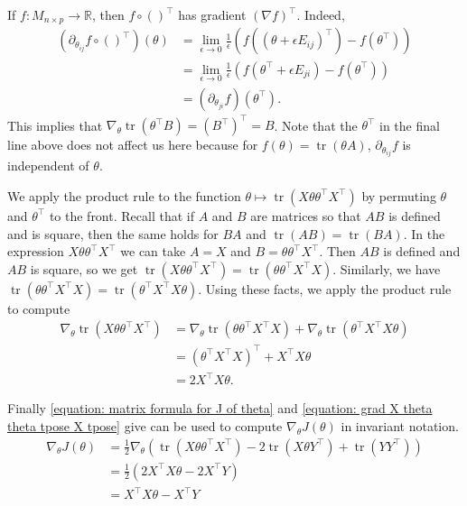 \documentclass[paper=letter]{scrartcl}
\theoremstyle{definition}
\DeclareMathOperator{\trace}{tr}
\newcommand{\grad}{\nabla}
\newcommand{\tpose}{^\top}
\newcommand{\reals}{\mathbb R}
\begin{document}
If $f \colon M_{n \times p} \to \reals$, then $f\circ ()\tpose$ has gradient 
$(\grad f)\tpose$.  Indeed,
\begin{align*}
	(\partial_{\theta_{ij}} f\circ ()\tpose)(\theta)
	&= \lim_{\epsilon \to 0} \frac{1}{\epsilon} (f((\theta + \epsilon 
	E_{ij})\tpose) - f(\theta\tpose))\\
	&= \lim_{\epsilon \to 0} \frac{1}{\epsilon} (f(\theta\tpose + \epsilon 
	E_{ji}) - f(\theta\tpose))\\
	&= (\partial_{\theta_{ji}} f)(\theta\tpose).
\end{align*}
This implies that $\grad_{\theta} \trace(\theta\tpose B) = (B\tpose) \tpose = 
B$. Note that the $\theta\tpose$ in the final line above does not affect us 
here because for $f(\theta) = \trace(\theta A)$, $\partial_{\theta_{ij}} f$ is 
independent of $\theta$.  

We apply the product rule to the function $\theta \mapsto \trace(X\theta 
\theta\tpose X\tpose)$ by permuting $\theta$ and $\theta\tpose$ to the front.  
Recall that if $A$ and $B$ are matrices so that $AB$ is defined and is square, 
then the same holds for $BA$ and $\trace(AB) = \trace (BA)$.  In the expression 
$X\theta \theta\tpose X \tpose$ we can take $A = X$ and $B = \theta 
\theta\tpose X\tpose$.  Then $AB$ is defined and $AB$ is square, so we get 
$\trace(X \theta \theta\tpose X\tpose) = \trace(\theta \theta \tpose X\tpose 
X)$.  Similarly, we have $\trace(\theta \theta\tpose X\tpose X) = \trace( 
\theta \tpose X\tpose X \theta)$.  Using these facts, we apply the product rule 
to compute
\begin{align}
	\nonumber
	\grad_{\theta} \trace( X \theta \theta\tpose X\tpose)
	\nonumber
	&= \grad_{\theta} \trace (\theta \theta\tpose X\tpose X) + 
	\grad_{\theta}\trace( \theta \tpose X\tpose X \theta)\\
	\nonumber
	& = (\theta\tpose X\tpose X)\tpose + X\tpose X \theta \\
	\label{equation: grad X theta theta tpose X tpose}
	& = 2 X\tpose X \theta.
\end{align}


Finally \eqref{equation: matrix formula for J of theta} and \eqref{equation: 
grad X theta theta tpose X tpose} give can be used to compute $\grad_{\theta} 
J(\theta)$ in invariant notation.
\begin{align}
	\nonumber
	\grad_\theta J(\theta) & = \frac{1}{2} \grad_{\theta} \left(\trace ( 
X\theta \theta\tpose X\tpose) - 2\trace(X\theta Y\tpose)+ \trace (YY\tpose) 
\right)
	\\
	\nonumber
	& = \frac{1}{2}(2 X\tpose X \theta - 2X\tpose Y)\\
	\label{equation: theta derivative of J}
	& = X\tpose X \theta - X\tpose Y
\end{align}
\end{document}
